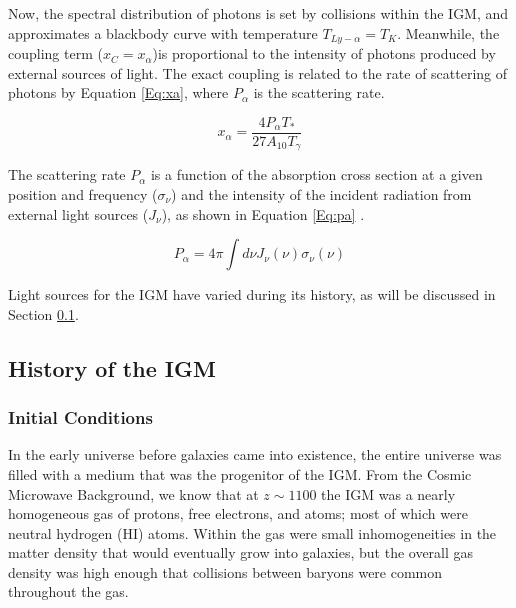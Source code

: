 Now, the spectral distribution of \lya  photons is set by collisions within the IGM, and approximates a blackbody curve with temperature $T_{Ly-\alpha} = T_K$. Meanwhile, the \lya  coupling term ($x_C = x_{\alpha}$)is proportional to the intensity of \lya  photons produced by external sources of light. The exact \lya  coupling is related to the rate of scattering of \lya  photons by Equation \ref{Eq:xa}, where $P_{\alpha}$ is the scattering rate. 

\begin{equation}\label{Eq:xa}
x_{\alpha} = \frac{4 P_{\alpha} T_*}{27 A_{10} T_{\gamma}}
\end{equation}

The scattering rate $P_{\alpha}$ is a function of the absorption cross section at a given position and frequency ($\sigma_{\nu}$) and the intensity of the incident radiation from external light sources ($J_{\nu}$), as shown in Equation \ref{Eq:pa} \cite{furlanetto_2006}. 

\begin{equation}\label{Eq:pa}
P_{\alpha} = 4 \pi \int d\nu J_{\nu}(\nu) \sigma_{\nu}(\nu)
\end{equation}

Light sources for the IGM have varied during its history, as will be discussed in Section \ref{Sec:IGMhist}.

\subsection{History of the IGM} \label{Sec:IGMhist}

\subsubsection{Initial Conditions}
In the early universe before galaxies came into existence, the entire universe was filled with a medium that was the progenitor of the IGM. From the Cosmic Microwave Background, we know that at $z \sim 1100$ the IGM was a nearly homogeneous gas of protons, free electrons, and atoms; most of which were neutral hydrogen (HI) atoms. Within the gas were small inhomogeneities in the matter density that would eventually grow into galaxies, but the overall gas density was high enough that collisions between baryons were common throughout the gas. 

